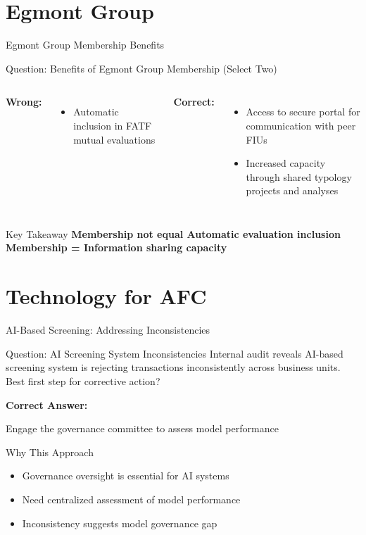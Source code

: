 \documentclass{beamer}
\begin{document}
\section{Egmont Group}
\begin{frame}{Egmont Group Membership Benefits}
\begin{block}{Question: Benefits of Egmont Group Membership (Select Two)}
\end{block}

\begin{columns}
\textcolor{wrong}{\textbf{ Wrong:}}
\begin{itemize}
    \item Automatic inclusion in FATF mutual evaluations
\end{itemize}

\textcolor{correct}{\textbf{Correct:}}
\begin{itemize}
    \item Access to secure portal for communication with peer FIUs
    \item Increased capacity through shared typology projects and analyses
\end{itemize}
\end{columns}

\begin{block}{Key Takeaway}
\textbf{Membership not equal Automatic evaluation inclusion} \\
\textbf{Membership = Information sharing capacity}
\end{block}
\end{frame}

\section{Technology for AFC}
\begin{frame}{AI-Based Screening: Addressing Inconsistencies}
\begin{block}{Question: AI Screening System Inconsistencies}
\small{Internal audit reveals AI-based screening system is rejecting transactions inconsistently across business units. Best first step for corrective action?}
\end{block}

\vspace{0.3cm}
\textcolor{correct}{\textbf{Correct Answer:}}
\begin{center}
\Large{Engage the governance committee to assess model performance}
\end{center}

\begin{block}{Why This Approach}
\begin{itemize}
    \item Governance oversight is essential for AI systems
    \item Need centralized assessment of model performance
    \item Inconsistency suggests model governance gap
\end{itemize}
\end{block}
\end{frame}
\end{document}
